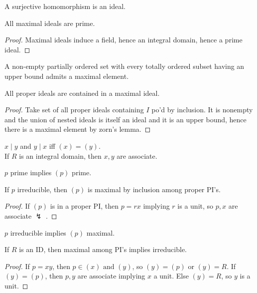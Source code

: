 \begin{proposition}
	A surjective homomorphism is an ideal.
\end{proposition}
\begin{theorem}
	All maximal ideals are prime.
\end{theorem}
\begin{proof}
	Maximal ideals induce a field, hence an integral domain, hence a prime ideal.
\end{proof}
\begin{definition}
A non-empty partially ordered set with every totally ordered subset having an upper bound admits a maximal element.
\end{definition}
\begin{theorem}
All proper ideals are contained in a maximal ideal.
\end{theorem}
\begin{proof}
	Take set of all proper ideals containing \(I\) po'd by inclusion. It is nonempty and the union of nested ideals is itself an ideal and it is an upper bound, hence there is a maximal element by zorn's lemma.
\end{proof}
\begin{proposition}
	\(x \mid y\) and \(y \mid x\) iff \(\left( x \right)  = \left( y \right) \).\\
	If \(R\) is an integral domain, then \(x, y \)  are associate.
\end{proposition}
\begin{proposition}
\(p\) prime implies \(\left( p \right) \) 	prime.
\end{proposition}
\begin{theorem}
If \(p\) irreducible, then \( \left( p \right) \) is maximal by inclusion among proper PI's.
\end{theorem}
\begin{proof}
	If \(\left( p \right) \) is in a proper PI, then \(p = rx\) implying \(r\) is a unit, so \(p, x\) are associate \(\lightning\) .
\end{proof}
\begin{corollary}
	\(p\) irreducible implies \(\left( p \right) \) maximal.
\end{corollary}
\begin{theorem}
	If \(R\) is an ID, then maximal among PI's implies irreducible.
\end{theorem}
\begin{proof}
	If \(p = xy\), then \(p \in \left( x \right) \text{ and } \left( y \right) \), so \(\left( y \right)  = \left( p \right) \) or \(\left( y \right)  = R\). If \(\left( y \right)  = \left( p \right) \), then \(p, y\) are associate implying \(x\) a unit. Else \( \left( y \right)  = R\), so \(y\) is a unit.
\end{proof}
